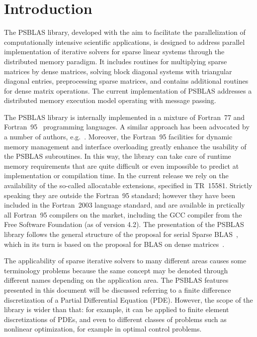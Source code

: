 \section{Introduction}\label{sec:intro}

The PSBLAS library, developed with the aim to facilitate the
parallelization of computationally intensive scientific applications,
is designed to address parallel implementation of iterative solvers
for sparse linear systems through the distributed memory paradigm.  It
includes routines for multiplying sparse matrices by dense matrices,
solving block diagonal systems with triangular diagonal entries,
preprocessing sparse matrices, and contains additional routines for
dense matrix operations.  The current implementation of PSBLAS
addresses a distributed memory execution model operating with message
passing. 

The PSBLAS library is internally implemented in a mixture of
Fortran~77 and Fortran~95~\cite{metcalf} programming languages. 
A similar approach has been advocated by a number of authors,
e.g.~\cite{machiels}.  Moreover, the Fortran~95 facilities for dynamic
memory management and interface overloading greatly enhance the
usability of the PSBLAS 
subroutines. In this way, the library can take care of runtime memory
requirements that are quite difficult or even impossible to predict at
implementation or compilation time.  
In the current release we rely on the availability of the so-called
allocatable extensions, specified in TR~15581. Strictly speaking they
are outside the Fortran~95 standard; however they have been included
in  the Fortran~2003 language standard, and are available in
prctically all Fortran~95 compilers on the market, including the GCC
compiler from the Free Software Foundation (as of version 4.2). 
The presentation of the
PSBLAS library follows the general structure of the proposal for
serial Sparse BLAS~\cite{sblas97,sblas02}, which in its turn is based on the
proposal for BLAS on dense matrices~\cite{BLAS1,BLAS2,BLAS3}.

The applicability of sparse iterative solvers to many different areas
causes some terminology problems because the same concept may be
denoted through different names depending on the application area. The
PSBLAS features presented in this document will be discussed referring
to a   finite difference discretization of a Partial Differential
Equation (PDE). However, the scope of the library is wider than
that: for example, it can be applied to finite element discretizations
of PDEs, and even to different classes of problems such as nonlinear
optimization, for example in optimal control problems.

